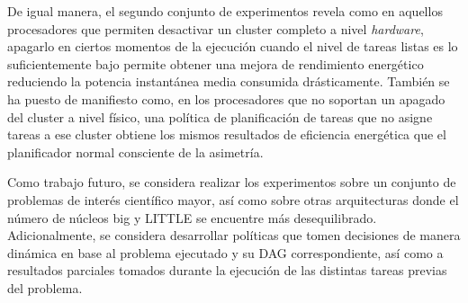 De igual manera, el segundo conjunto de experimentos revela como en
aquellos procesadores que permiten desactivar un cluster completo a nivel
\emph{hardware}, apagarlo en ciertos momentos de la ejecución cuando el
nivel de tareas listas es lo suficientemente bajo permite obtener una
mejora de rendimiento energético reduciendo la potencia instantánea media
consumida drásticamente. También se ha puesto de manifiesto como, en los
procesadores que no soportan un apagado del cluster a nivel físico, una
política de planificación de tareas que no asigne tareas a ese cluster
obtiene los mismos resultados de eficiencia energética que el planificador
normal consciente de la asimetría.


Como trabajo futuro, se considera realizar los experimentos sobre un
conjunto de problemas de interés científico mayor, así como sobre otras
arquitecturas donde el número de núcleos big y LITTLE se encuentre más
desequilibrado. Adicionalmente, se considera desarrollar políticas que
tomen decisiones de manera dinámica en base al problema ejecutado y su DAG
correspondiente, así como a resultados parciales tomados durante la
ejecución de las distintas tareas previas del problema.



